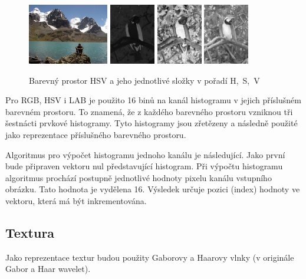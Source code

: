 \documentclass[czech,BP]{thesiskiv}
\begin{document}
\begin{figure}[H]
		\centering
		\includegraphics[height=100px]{./img/img_histogram.jpg}
		\includegraphics[height=100px]{./img/hsv_h.jpg}
		\includegraphics[height=100px]{./img/hsv_s.jpg}
		\includegraphics[height=100px]{./img/hsv_v.jpg}	
		\caption{Barevný prostor HSV a jeho jednotlivé složky v pořadí H,~S,~V}
\end{figure}

\par Pro RGB, HSV i LAB je použito 16 binů na kanál histogramu v jejich příslušném barevném prostoru. To znamená, že z každého barevného prostoru vzniknou tři šestnácti prvkové histogramy. Tyto histogramy jsou zřetězeny a následně použité jako reprezentace příslušného barevného prostoru.
 
\par  Algoritmus pro výpočet histogramu jednoho kanálu je následující. Jako první bude připraven vektoru nul představující histogram. Při výpočtu histogramu algoritmus prochází postupně jednotlivé hodnoty pixelu kanálu vstupního obrázku. Tato hodnota je vydělena 16. Výsledek určuje pozici (index) hodnoty ve vektoru, která má být inkrementována.

\subsection{Textura}
\par Jako reprezentace textur budou použity Gaborovy a Haarovy vlnky (v originále Gabor a Haar wavelet). 
\end{document}

